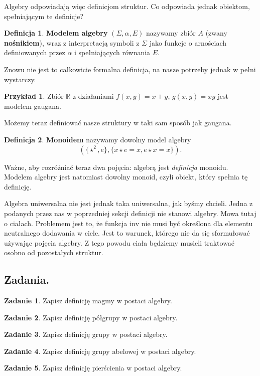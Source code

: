 \documentclass{article}
\theoremstyle{definition}
\newtheorem{definition}{Definicja}[section]
\newtheorem{example}{Przykład}[section]
\newtheorem{exercise}{Zadanie}[section]
\begin{document}
Algebry odpowiadają więc definicjom struktur.
Co odpowiada jednak obiektom, spełniającym te definicje?

\begin{definition}
    \textbf{Modelem algebry} $(\Sigma, \alpha, E)$ nazywamy zbiór $A$ (zwany \textbf{nośnikiem}),
	wraz z interpretacją symboli z $\Sigma$ jako funkcje o arnościach definiowanych przez $\alpha$ i spełniających równania $E$.
\end{definition}
Znowu nie jest to całkowicie formalna definicja,
na nasze potrzeby jednak w pełni wystarczy.

\begin{example}
	Zbiór $\mathbb{R}$ z działaniami $f(x, y) = x + y$, $g(x, y) = xy$ jest modelem gaugana.
\end{example}

Możemy teraz definiować nasze struktury w taki sam sposób jak gaugana.
\begin{definition}
	\textbf{Monoidem} nazywamy dowolny model algebry
	\begin{equation*}
		(\{\star^2, e\}, \{ x \star e = x, e \star x = x \}).
	\end{equation*}
\end{definition}

Ważne, aby rozróżniać teraz dwa pojęcia: algebrą jest \textit{definicja} monoidu.
Modelem algebry jest natomiast dowolny monoid,
	czyli obiekt,
	który spełnia tę definicję.

Algebra uniwersalna nie jest jednak taka uniwersalna,
	jak byśmy chcieli.
Jedna z podanych przez nas w poprzedniej sekcji definicji nie stanowi algebry.
Mowa tutaj o ciałach.
Problemem jest to,
	że funkcja $\mathrm{inv}$ nie musi być określona dla elementu neutralnego dodawania w ciele.
Jest to warunek,
	którego nie da się sformułować używając pojęcia algebry.
Z tego powodu ciała będziemy musieli traktować osobno od pozostałych struktur.

\subsection{Zadania.}

\begin{exercise}
	Zapisz definicję magmy w postaci algebry.
\end{exercise}
\begin{exercise}
	Zapisz definicję półgrupy w postaci algebry.
\end{exercise}
\begin{exercise}
	Zapisz definicję grupy w postaci algebry.
\end{exercise}
\begin{exercise}
	Zapisz definicję grupy abelowej w postaci algebry.
\end{exercise}
\begin{exercise}
	Zapisz definicję pierścienia w postaci algebry.
\end{exercise}
\end{document}
